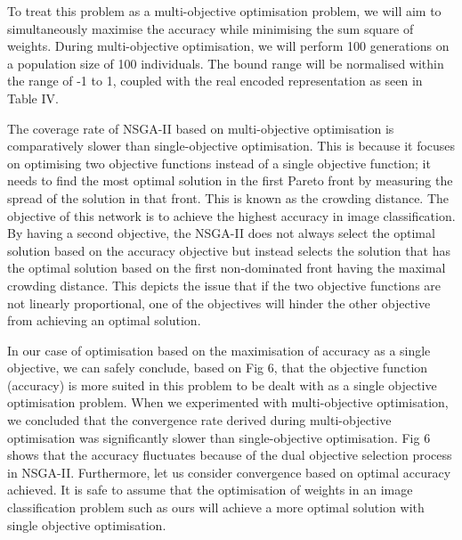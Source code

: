 \documentclass[conference]{IEEEtran}
\begin{document}
\par
To treat this problem as a multi-objective optimisation problem, we will aim to simultaneously maximise the accuracy while minimising the sum square of weights. During multi-objective optimisation, we will perform 100 generations on a population size of 100 individuals. The bound range will be normalised within the range of -1 to 1, coupled with the real encoded representation as seen in Table IV.
\par
The coverage rate of NSGA-II based on multi-objective optimisation is comparatively slower than single-objective optimisation. This is because it focuses on optimising two objective functions instead of a single objective function; it needs to find the most optimal solution in the first Pareto front by measuring the spread of the solution in that front. This is known as the crowding distance. The objective of this network is to achieve the highest accuracy in image classification. By having a second objective, the NSGA-II does not always select the optimal solution based on the accuracy objective but instead selects the solution that has the optimal solution based on the first non-dominated front having the maximal crowding distance. This depicts the issue that if the two objective functions are not linearly proportional, one of the objectives will hinder the other objective from achieving an optimal solution.
\par
In our case of optimisation based on the maximisation of accuracy as a single objective, we can safely conclude, based on Fig 6, that the objective function (accuracy) is more suited in this problem to be dealt with as a single objective optimisation problem. When we experimented with multi-objective optimisation, we concluded that the convergence rate derived during multi-objective optimisation was significantly slower than single-objective optimisation. Fig 6 shows that the accuracy fluctuates because of the dual objective selection process in NSGA-II. Furthermore, let us consider convergence based on optimal accuracy achieved. It is safe to assume that the optimisation of weights in an image classification problem such as ours will achieve a more optimal solution with single objective optimisation. 
\end{document}
